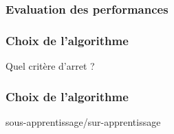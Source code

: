 \documentclass{formation}
\begin{document}
\begin{frame}
  \frametitle{Evaluation des performances}
\end{frame}

\begin{frame}
  \frametitle{Choix de l'algorithme}
  Quel critère d'arret ?
\end{frame}

\begin{frame}
  \frametitle{Choix de l'algorithme}
  sous-apprentissage/sur-apprentissage
\end{frame}
\end{document}
